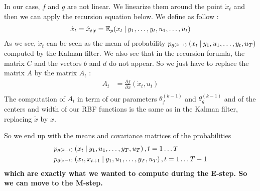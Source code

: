 In our case, $f$ and $g$ are not linear.
We linearize them around the point $\dot{x}_t$ and then we can apply the recursion equation below.
We define  as follow :
\begin{align*}
  \dot{x}_t &= \hat{x}_{t \mathbin{\vert} t} = \mathbb{E}_p(x_t \mathbin{\vert} y_1, \ldots , y_t, u_1, \ldots , u_t) \\
\end{align*}
As we see, $\dot{x}_t$ can be seen as the mean of probability  $p_{\theta^{(k-1)}}\left(x_t \mathbin{\vert} y_1, u_1, \ldots, y_t, u_T \right)$ computed by the Kalman filter.
We also see that in the recursion forumla, the matrix $C$ and the vectors $b$ and $d$ do not appear.
So we just have to replace the matrix $A$ by the matrix $A_t$ :
\begin{align*}
  A_t &= \frac{\partial f}{\partial x}(\dot{x}_t, u_t)\\
\end{align*}
The computation of $A_t$ in term of our parameters $\theta_f^{(k-1)}$ and $\theta_g^{(k-1)}$ and of the centers and width of our RBF functions is the same as in the Kalman filter, replacing $\tilde{x}$ by $\dot{x}$.

So we end up with the means and covariance matrices of the probabilities
\begin{align*}
  &p_{\theta^{(k-1)}}\left(x_t \mathbin{\vert} y_1, u_1, \ldots, y_T, u_T \right), t=1 \ldots T\\
  &p_{\theta^{(k-1)}}\left(x_t, x_{t+1} \mathbin{\vert} y_1, u_1, \ldots, y_T, u_T \right), t=1 \ldots T-1\\
\end{align*}
\textbf{which are exactly what we wanted to compute during the E-step.
So we can move to the M-step.}
